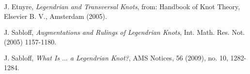 \documentclass{article}
\begin{document}









\begin{thebibliography}{9}
    J. Etnyre,
    \textit{Legendrian and Transversal Knots},
    from: Handbook of Knot Theory,  
    Elsevier B. V.,
    Amsterdam (2005).

    J. Sabloff,
    \textit{Augmentations and Rulings of Legendrian Knots},
    Int. Math. Res. Not. (2005) 1157-1180.

    J. Sabloff,
    \textit{What Is $\ldots$ a Legendrian Knot?},
    AMS Notices, 56 (2009), no. 10, 1282-1284.
\end{thebibliography}
\end{document}
